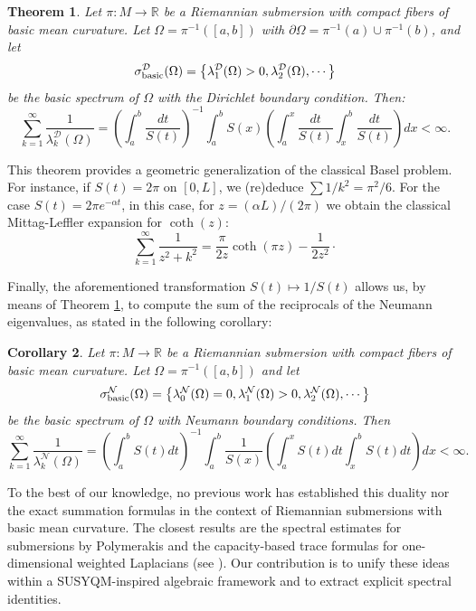 \documentclass{amsart}
\newtheorem{theorem}{Theorem}[section]
\newtheorem{corollary}[theorem]{Corollary}
\theoremstyle{definition}
\theoremstyle{remark}
\numberwithin{equation}{section}
\begin{document}
\begin{theorem}\label{teo:sum}
Let $\pi: M\to \mathbb{R}$ be a Riemannian submersion with compact fibers of basic mean curvature. Let $\Omega=\pi^{-1}([a,b])$ with $\partial \Omega=\pi^{-1}(a)\cup\pi^{-1}(b)$, 
and let 
 $$
 \sigma_{\rm basic}^\mathcal{D}(\Omega)=\left\{\lambda^\mathcal{D}_1(\Omega)>0, \lambda^\mathcal{D}_2(\Omega), \cdots \right\}
 $$
 be the basic spectrum of $\Omega$ with the Dirichlet boundary condition. Then:
\begin{equation*}
\sum_{k=1}^{\infty}\frac{1}{\lambda_k^{\mathcal{D}}(\Omega)}= \left( {\int_{a}^b\frac{dt}{S(t)}} \right)^{-1}\int_a^b S(x)\left(\int_a^x\frac{dt}{S(t)}\int_x^b\frac{dt}{S(t)}\right)dx < \infty.
\end{equation*}
\end{theorem}

This theorem provides a geometric generalization of the classical Basel problem. For instance, if $S(t)=2\pi$ on $[0,L]$, we (re)deduce $\sum 1/k^2 = \pi^2/6$. For the case $S(t)=2\pi e^{-\alpha t}$, in this case, for $z = (\alpha L)/(2\pi)$ we obtain the classical Mittag-Leffler expansion for $\coth(z)$:
\begin{equation*}
\sum_{k=1}^{\infty} \frac{1}{z^2+k^2} = \frac{\pi}{2z} \coth{(\pi z)} -
\frac{1}{2z^2} \cdot
\end{equation*}

Finally, the aforementioned transformation $S(t)\mapsto 1/S(t) $ allows us, by means of Theorem \ref{teo:sum}, to compute the sum of the reciprocals of the Neumann eigenvalues, as stated in the following corollary:

\begin{corollary}\label{cor:sumneumann}
 Let $\pi: M\to \mathbb{R}$ be a Riemannian submersion with compact fibers of basic mean curvature. Let $\Omega=\pi^{-1}([a,b])$  and let 
 $$
 \sigma_{\rm basic}^\mathcal{N}(\Omega)=\left\{\lambda^\mathcal{N}_0(\Omega)=0,\lambda^\mathcal{N}_1(\Omega)>0, \lambda^\mathcal{N}_2(\Omega),\cdots \right\}
 $$
 be the basic spectrum of $\Omega$ with Neumann boundary conditions. Then
 $$
 \sum_{k=1}^{\infty}\frac{1}{\lambda_k^{\mathcal{N}}(\Omega)}= \left( {\int_{a}^bS(t)dt} \right)^{-1}\int_a^b \frac{1}{S(x)}\left(\int_a^xS(t)dt\int_x^bS(t)dt\right)dx<\infty.
 $$
\end{corollary}

To the best of our knowledge, no previous work has established this duality nor the exact summation formulas in the context of Riemannian submersions with basic mean curvature. The closest results are the spectral estimates for submersions by Polymerakis \cite{Polymerakis2021} and the capacity-based trace formulas for one-dimensional weighted Laplacians (see \cite{bessa2016, GriExp}). Our contribution is to unify these ideas within a SUSYQM-inspired algebraic framework and to extract explicit spectral identities.
\end{document}
